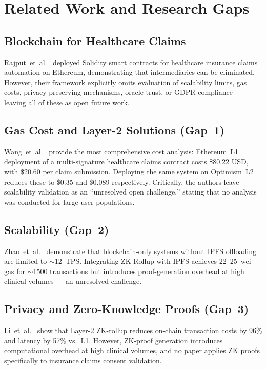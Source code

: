 \documentclass[journal]{IEEEtran}
\begin{document}
\section{Related Work and Research Gaps}
\label{sec:related}

\subsection{Blockchain for Healthcare Claims}

Rajput~et~al.~\cite{lit:springer2025} deployed Solidity smart contracts for
healthcare insurance claims automation on Ethereum, demonstrating that
intermediaries can be eliminated. However, their framework explicitly omits
evaluation of scalability limits, gas costs, privacy-preserving mechanisms,
oracle trust, or GDPR compliance — leaving all of these as open future work.

\subsection{Gas Cost and Layer-2 Solutions (Gap~1)}

Wang~et~al.~\cite{lit:arxiv2407} provide the most comprehensive cost analysis:
Ethereum~L1 deployment of a multi-signature healthcare claims contract costs
\$80.22 USD, with \$20.60 per claim submission. Deploying the same system on
Optimism~L2 reduces these to \$0.35 and \$0.089 respectively. Critically,
the authors leave scalability validation as an ``unresolved open challenge,''
stating that no analysis was conducted for large user populations.

\subsection{Scalability (Gap~2)}

Zhao~et~al.~\cite{lit:pmc11111748} demonstrate that blockchain-only systems
without IPFS offloading are limited to $\sim$12~TPS. Integrating ZK-Rollup
with IPFS achieves 22--25~wei gas for $\sim$1500 transactions but introduces
proof-generation overhead at high clinical volumes — an unresolved challenge.

\subsection{Privacy and Zero-Knowledge Proofs (Gap~3)}

Li~et~al.~\cite{lit:nature2026} show that Layer-2 ZK-rollup reduces on-chain
transaction costs by 96\% and latency by 57\% vs.\ L1. However, ZK-proof
generation introduces computational overhead at high clinical volumes, and
no paper applies ZK proofs specifically to insurance claims consent validation.
\end{document}
